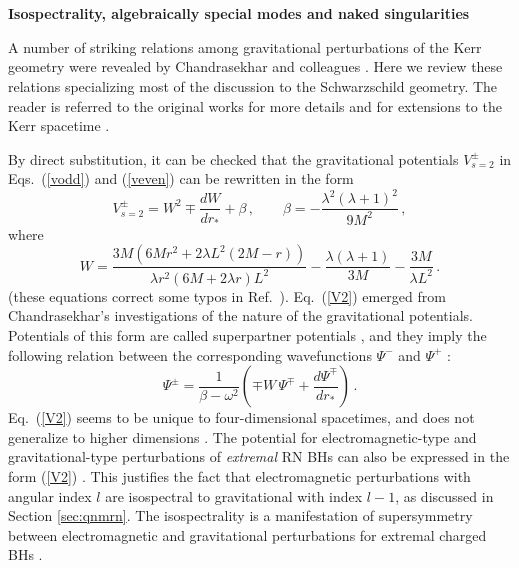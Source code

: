 \documentclass[]{iopart}
\def\be{\begin{equation}}
\def\ee{\end{equation}}
\begin{document}


\appendix

\section{\label{app:relpotentials}} 
{\bf Isospectrality, algebraically special modes and naked singularities}
\vskip 2mm

\noindent
A number of striking relations among gravitational perturbations of the Kerr
geometry were revealed by Chandrasekhar and colleagues
\cite{MTB,chandrarelation,Chandrasekhar:1975qn,chandraspecial,Wald1973}. Here
we review these relations specializing most of the discussion to the
Schwarzschild geometry. The reader is referred to the original works for more
details and for extensions to the Kerr spacetime
\cite{MTB,chandrarelation,Chandrasekhar:1975qn,chandraspecial}.
 
By direct substitution, it can be checked that the gravitational potentials
$V_{s=2}^{\pm}$ in Eqs.~(\ref{vodd}) and (\ref{veven}) can be rewritten in the
form
%
\begin{equation}
V_{s=2}^\pm=W^2\mp\frac{dW}{dr_*}+\beta\,, \qquad \beta=-\frac{\lambda^2(\lambda+1)^2}{9M^2}\,,\label{V2}
\end{equation}
%
where
%
\be
W=\frac{3M\left (6 Mr^2+2\lambda L^2(2M-r) \right
)}{\lambda r^2\left (6M+2\lambda r\right)L^2}-
\frac{\lambda (\lambda+1)}{3M}-\frac{3M}{\lambda L^2}\,.
\ee
%
(these equations correct some typos in
Ref.~\cite{Cardoso:2001bb}). Eq.~(\ref{V2}) emerged from Chandrasekhar's
investigations \cite{Chandrasekhar:1975qn,chandrarelation,chandraspecial} of
the nature of the gravitational potentials. Potentials of this form are called
superpartner potentials \cite{Cooper:1994eh}, and they imply the following
relation between the corresponding wavefunctions $\Psi^-$ and $\Psi^+$
\cite{MTB,Cardoso:2001bb}:
%
\be
\Psi^{\pm}=\frac{1}{\beta-\omega^2}\left (\mp W\,\Psi^{\mp}+\frac{d\Psi^{\mp}}{dr_*}\right )\,.\label{superpartner1}
\ee
%
Eq.~(\ref{V2}) seems to be unique to four-dimensional spacetimes, and does not
generalize to higher dimensions \cite{Kodama:2003jz,Ishibashi:2003ap}.  The
potential for electromagnetic-type and gravitational-type perturbations of
{\it extremal} RN BHs can also be expressed in the form (\ref{V2})
\cite{Onozawa:1996ba,Okamura:1997ic}. This justifies the fact that
electromagnetic perturbations with angular index $l$ are isospectral to
gravitational with index $l-1$, as discussed in Section \ref{sec:qnmrn}. The
isospectrality is a manifestation of supersymmetry between electromagnetic and
gravitational perturbations for extremal charged BHs
\cite{Onozawa:1996ba,Okamura:1997ic,Kallosh:1997ug}.
\end{document}
